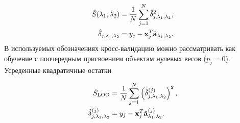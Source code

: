 \begin{align}
	\hat S(\lambda_1, \lambda_2) &= \frac1N\sum_{j=1}^N \hat\delta_{j, \lambda_1, \lambda_2}^2, \\
	\hat \delta_{j, \lambda_1, \lambda_2} &= y_j - \boldsymbol{\mathbf{x}}_j^T \hat {\boldsymbol{\mathbf{a}}}_{\lambda_1, \lambda_2}.
\end{align}
В используемых обозначениях кросс-валидацию можно рассматривать как обучение с поочередным присвоением объектам нулевых весов ($p_j=0$).
Усреденные квадратичные остатки 


\begin{align}
	\hat{S}_{\text{LOO}}&=\frac1N\sum_{j=1}^N\left(\hat{\delta}_{j, \lambda_1, \lambda_2}^{(j)}\right)^2, \\
	\hat \delta_{j, \lambda_1, \lambda_2}^{(j)} &= y_j - \boldsymbol{\mathbf{x}}_j^T \hat {\boldsymbol{\mathbf{a}}}_{\lambda_1, \lambda_2}^{(j)}.
\end{align}
